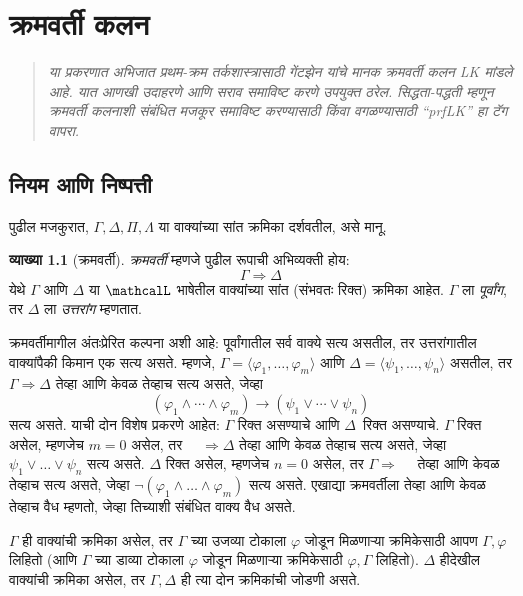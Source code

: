 \documentclass[11pt,a4paper,openany]{book}
\theoremstyle{definition}
\newtheorem{defn}{व्याख्या}[section]
\newenvironment{explain}{}{}
\newcommand{\tuple}[1]{\langle #1\rangle}
\newcommand{\lif}{\mathbin{\to}}
\newenvironment{editorial}{\begin{quote}\small\itshape}{\end{quote}}
\newcommand{\applytofirst}[2]{{\expandafter#1#2}}
\newcommand{\Lang}[1]{\applytofirst{\mathcal}{#1}}
\newcommand{\Sequent}{\Rightarrow}
\begin{document}
\chapter{क्रमवर्ती कलन}\label{fol:seq::chap}
\begin{editorial}
  या प्रकरणात अभिजात प्रथम-क्रम तर्कशास्त्रासाठी गेंटझेन यांचे मानक
  क्रमवर्ती कलन LK मांडले आहे. यात आणखी उदाहरणे आणि सराव समाविष्ट करणे
  उपयुक्त ठरेल. सिद्धता-पद्धती म्हणून क्रमवर्ती कलनाशी संबंधित मजकूर
  समाविष्ट करण्यासाठी किंवा वगळण्यासाठी ``prfLK'' हा टॅग वापरा.
\end{editorial}






\section{नियम आणि निष्पत्ती}\label{fol:seq:rul:sec}

पुढील मजकुरात, $\Gamma, \Delta, \Pi, \Lambda$ या वाक्यांच्या सांत
क्रमिका दर्शवतील, असे मानू.

\begin{defn}[क्रमवर्ती]
\emph{क्रमवर्ती} म्हणजे पुढील रूपाची अभिव्यक्ती होय:
\[
\Gamma \Sequent \Delta
\]
येथे $\Gamma$ आणि $\Delta$ या $\Lang L$ भाषेतील वाक्यांच्या
सांत (संभवतः रिक्त) क्रमिका आहेत. $\Gamma$ ला \emph{पूर्वांग}, तर
$\Delta$ ला \emph{उत्तरांग} म्हणतात.
\end{defn}

\begin{explain}
क्रमवर्तीमागील अंतःप्रेरित कल्पना अशी आहे: पूर्वांगातील सर्व वाक्ये
सत्य असतील, तर उत्तरांगातील वाक्यांपैकी किमान एक सत्य असते. म्हणजे,
$\Gamma = \tuple{\varphi_1, \dots, \varphi_m}$ आणि
$\Delta = \tuple{\psi_1, \dots, \psi_n}$ असतील, तर $\Gamma \Sequent \Delta$
तेव्हा आणि केवळ तेव्हाच सत्य असते, जेव्हा
\[
(\varphi_1 \land \cdots \land \varphi_m) \lif (\psi_1 \lor \cdots \lor
\psi_n)
\]
सत्य असते. याची दोन विशेष प्रकरणे आहेत: $\Gamma$ रिक्त असण्याचे आणि
$\Delta$~रिक्त असण्याचे. $\Gamma$ रिक्त असेल, म्हणजेच $m = 0$ असेल, तर
$\quad \Sequent \Delta$ तेव्हा आणि केवळ तेव्हाच सत्य असते, जेव्हा
$\psi_1 \lor \dots \lor \psi_n$ सत्य असते. $\Delta$ रिक्त असेल, म्हणजेच
$n = 0$ असेल, तर $\Gamma \Sequent \quad$ तेव्हा आणि केवळ तेव्हाच सत्य
असते, जेव्हा $\lnot(\varphi_1 \land \dots \land \varphi_m)$ सत्य असते. एखाद्या
क्रमवर्तीला तेव्हा आणि केवळ तेव्हाच वैध म्हणतो, जेव्हा तिच्याशी संबंधित
वाक्य वैध असते.
\end{explain}

$\Gamma$ ही वाक्यांची क्रमिका असेल, तर $\Gamma$ च्या उजव्या टोकाला
$\varphi$ जोडून मिळणाऱ्या क्रमिकेसाठी आपण $\Gamma, \varphi$ लिहितो (आणि $\Gamma$
च्या डाव्या टोकाला $\varphi$ जोडून मिळणाऱ्या क्रमिकेसाठी $\varphi, \Gamma$
लिहितो). $\Delta$ हीदेखील वाक्यांची क्रमिका असेल, तर $\Gamma,
\Delta$ ही त्या दोन क्रमिकांची जोडणी असते.
\end{document}
